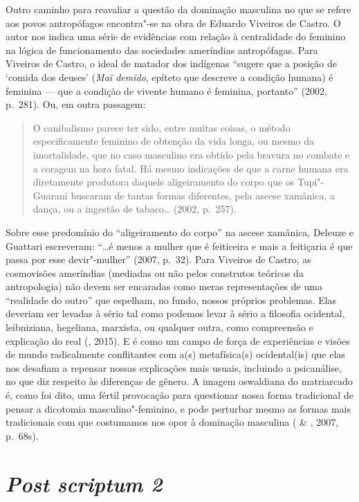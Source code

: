 Outro caminho para reavaliar a questão da dominação masculina no que se
refere aos povos antropófagos encontra"-se na obra de Eduardo Viveiros de
Castro. O autor nos indica uma série de evidências com relação à
centralidade do feminino na lógica de funcionamento das sociedades
ameríndias antropófagas. Para Viveiros de Castro, o ideal de matador dos
indígenas ``sugere que a posição de `comida dos deuses'
(\emph{Maï demïdo}, epíteto que descreve a condição humana) é feminina
--- que a condição de vivente humano é feminina, portanto'' (2002, p.~281). Ou, em outra passagem:

\begin{quote}
O canibalismo parece ter sido, entre muitas coisas, o método
especificamente feminino de obtenção da vida longa, ou mesmo da
imortalidade, que no caso masculino era obtido pela bravura no combate e
a coragem na hora fatal. Há mesmo indicações de que a carne humana era
diretamente produtora daquele aligeiramento do corpo que os Tupi"-Guarani
buscaram de tantas formas diferentes, pela ascese xamânica, a dança, ou
a ingestão de tabaco\ldots{} (2002, p.~257).
\end{quote}

Sobre esse predomínio do ``aligeiramento do corpo'' na ascese xamânica,
Deleuze e Guattari escreveram: ``\ldots{}é menos a mulher que é
feiticeira e mais a feitiçaria é que passa por esse
devir"-mulher'' (2007, p.~32). Para Viveiros
de Castro, as cosmovisões ameríndias (mediadas ou não pelos construtos
teóricos da antropologia) não devem ser encaradas como meras
representações de uma ``realidade do outro'' que espelham, no fundo,
nossos próprios problemas. Elas deveriam ser levadas à sério tal como
podemos levar à sério a filosofia ocidental, leibniziana, hegeliana,
marxista, ou qualquer outra, como compreensão e explicação do
real (, 2015). E é como um campo de força de
experiências e visões de mundo radicalmente conflitantes com a(s)
metafísica(s) ocidental(is) que elas nos desafiam a repensar nossas
explicações mais usuais, incluindo a psicanálise, no que diz respeito às
diferenças de gênero. A imagem oswaldiana do matriarcado é, como foi
dito, uma fértil provocação para questionar nossa forma tradicional de
pensar a dicotomia masculino"-feminino, e pode perturbar mesmo as formas
mais tradicionais com que costumamos nos opor à dominação
masculina ( \& , 2007, p.~68s).

\section{\emph{Post scriptum 2}}


